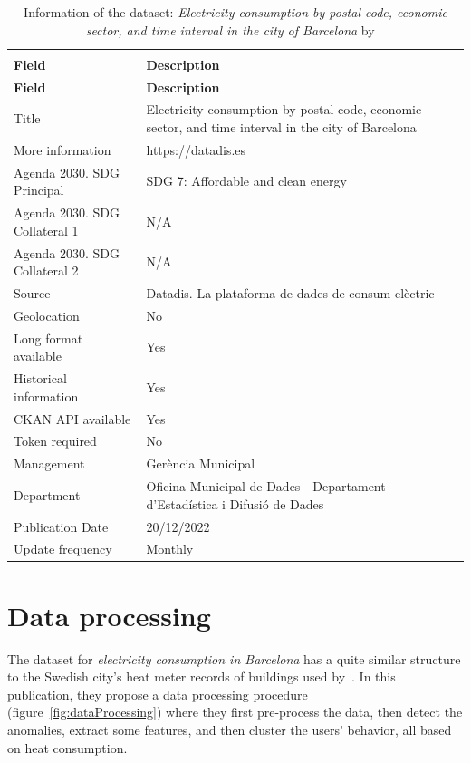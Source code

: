 \documentclass[a4paper,12pt,twoside]{ThesisStyle}
\begin{document}
\renewcommand{\arraystretch}{1.5}
\begin{longtable}{ll}
\caption{Information of the dataset: \textit{Electricity consumption by postal code, economic sector, and time interval in the city of Barcelona} by ~\cite{ElectricityBCNOD}}  \\
\label{taula:InformationDataset}  \\
\textbf{Field}                & \textbf{Description}\\
\hline
\endfirsthead
\textbf{Field}                & \textbf{Description} \\
\hline
\endhead
%
Title                         & \parbox{7.5cm}{Electricity consumption by postal code, economic sector, and time interval in the city of Barcelona} \\
More information              & https://datadis.es  \\
Agenda 2030. SDG Principal    & SDG 7: Affordable and clean energy  \\
Agenda 2030. SDG Collateral 1 & N/A  \\
Agenda 2030. SDG Collateral 2 & N/A  \\
Source                        & \parbox{7.5cm}{Datadis. La plataforma de dades de consum elèctric} \\
Geolocation                   & No   \\
Long format available         & Yes  \\
Historical information        & Yes  \\
CKAN API available            & Yes  \\
Token required                & No \\
Management                    & Gerència Municipal \\
Department                    & \parbox{7.5cm}{Oficina Municipal de Dades - Departament d'Estadística i Difusió de Dades} \\
Publication Date              & 20/12/2022\\
Update frequency              & Monthly\\ 
\hline
\end{longtable}

\section{Data processing}

The dataset for \textit{electricity consumption in Barcelona} has a quite similar structure to the Swedish city's heat meter records of buildings used by~\cite{du2019clustering}. In this publication, they propose a data processing procedure (figure~\ref{fig:dataProcessing}) where they first pre-process the data, then detect the anomalies, extract some features, and then cluster the users' behavior, all based on heat consumption. 
\end{document}
